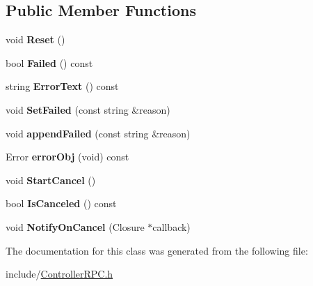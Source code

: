 \subsection*{Public Member Functions}
\begin{DoxyCompactItemize}
\item 
\mbox{\label{classcoappbrpc_1_1ControllerRPC_aac8d7a0e52a017d60a411a462bad6d91}} 
void {\bfseries Reset} ()
\item 
\mbox{\label{classcoappbrpc_1_1ControllerRPC_a20a3b119687bea2ac836db07a3b04287}} 
bool {\bfseries Failed} () const
\item 
\mbox{\label{classcoappbrpc_1_1ControllerRPC_a96035415234221d2972a3f2f790275ce}} 
string {\bfseries Error\+Text} () const
\item 
\mbox{\label{classcoappbrpc_1_1ControllerRPC_a3d91a6d0ba16232c531c3313e4412212}} 
void {\bfseries Set\+Failed} (const string \&reason)
\item 
\mbox{\label{classcoappbrpc_1_1ControllerRPC_a480586532b344e3ca8da2d2519ba593f}} 
void {\bfseries append\+Failed} (const string \&reason)
\item 
\mbox{\label{classcoappbrpc_1_1ControllerRPC_aab955bb22c799e5d544b3083fe64c7d7}} 
Error {\bfseries error\+Obj} (void) const
\item 
\mbox{\label{classcoappbrpc_1_1ControllerRPC_a48a78ccc3c70a2135c78d612154e077c}} 
void {\bfseries Start\+Cancel} ()
\item 
\mbox{\label{classcoappbrpc_1_1ControllerRPC_ab6458ec248edf24fcc83b12a2573e13f}} 
bool {\bfseries Is\+Canceled} () const
\item 
\mbox{\label{classcoappbrpc_1_1ControllerRPC_abc9385d7476171035cffb779c7966f89}} 
void {\bfseries Notify\+On\+Cancel} (Closure $\ast$callback)
\end{DoxyCompactItemize}


The documentation for this class was generated from the following file\+:\begin{DoxyCompactItemize}
\item 
include/\hyperlink{ControllerRPC_8h}{Controller\+R\+P\+C.\+h}\end{DoxyCompactItemize}
